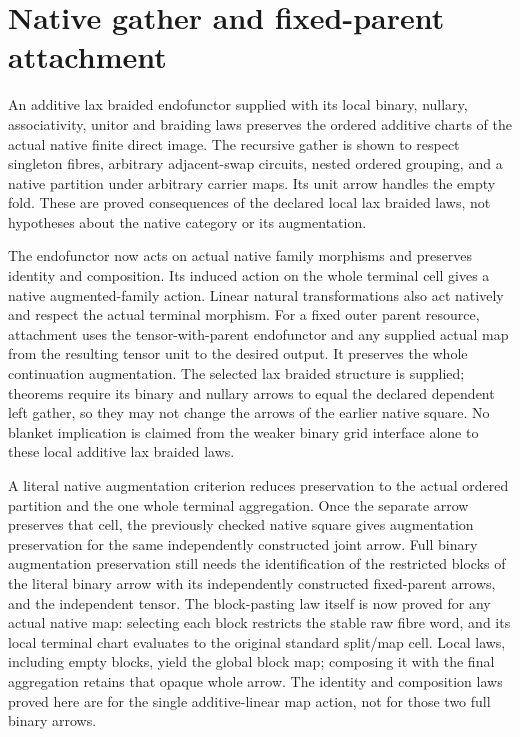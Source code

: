 \documentclass{article}
\begin{document}
\section*{Native gather and fixed-parent attachment}
An additive lax braided endofunctor supplied with its local binary,
nullary, associativity, unitor and braiding laws preserves the
ordered additive charts of the actual native finite direct image.
The recursive gather is shown to respect singleton fibres, arbitrary
adjacent-swap circuits, nested ordered grouping, and a native partition
under arbitrary carrier maps. Its unit arrow handles the empty fold.
These are proved consequences of the declared local lax braided laws,
not hypotheses about the native category or its augmentation.

The endofunctor now acts on actual native family morphisms and preserves
identity and composition. Its induced action on the whole terminal cell
gives a native augmented-family action. Linear natural transformations
also act natively and respect the actual terminal morphism.
For a fixed outer parent resource, attachment uses the tensor-with-parent
endofunctor and any supplied actual map from the resulting tensor unit
to the desired output. It preserves the whole continuation augmentation.
The selected lax braided structure is supplied; theorems require its
binary and nullary arrows to equal the declared dependent left gather,
so they may not change the arrows of the earlier native square.
No blanket implication is claimed from the weaker binary grid interface
alone to these local additive lax braided laws.

A literal native augmentation criterion reduces preservation to the
actual ordered partition and the one whole terminal aggregation. Once
the separate arrow preserves that cell, the previously checked native
square gives augmentation preservation for the same independently
constructed joint arrow. Full binary augmentation preservation still
needs the identification of the restricted blocks of the literal binary
arrow with its independently constructed fixed-parent arrows, and the
independent tensor. The block-pasting law itself is now proved for any actual
native map: selecting each block restricts the stable raw fibre word, and its
local terminal chart evaluates to the original standard split/map cell.
Local laws, including empty blocks, yield the global block map; composing it
with the final aggregation retains that opaque whole arrow.
The identity and composition laws proved here are for the single
additive-linear map action, not for those two full binary arrows.
\end{document}

